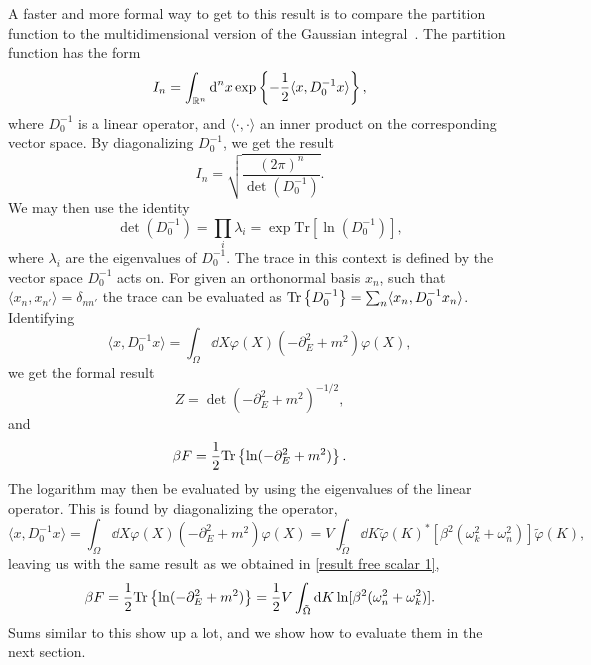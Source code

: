 A faster and more formal way to get to this result is to compare the partition function to the multidimensional version of the Gaussian integral~\autocite{kapustaFiniteTemperatureFieldTheory2006,peskinIntroductionQuantumField1995}.
The partition function has the form 
\begin{equation}
    I_n = \int_{\mathbb{R}^n} \text{d}^n x\, \text{exp} \left\{ - \frac{1}{2} \langle x, D_0^{-1} x\rangle  \right\},
\end{equation}
where $D_0^{-1}$ is a linear operator, and $\langle \cdot , \cdot \rangle$ an inner product on the corresponding vector space.
By diagonalizing $D_0^{-1}$, we get the result
\begin{equation}
    I_n = \sqrt{\frac{(2 \pi)^n}{\det(D_0^{-1})}}.
\end{equation}
We may then use the identity
%
\begin{equation}
    \label{lndettrln}
    \det(D_0^{-1}) = \prod_i \lambda_i = \exp{\text{Tr}[\ln(D_0^{-1})]},
\end{equation}
%
where $\lambda_i$ are the eigenvalues of $D_0^{-1}$.
The trace in this context is defined by the vector space $D_0^{-1}$ acts on.
For given an orthonormal basis $x_n$, such that $\langle x_n, x_{n'}\rangle = \delta_{nn'}$ the trace can be evaluated as $\text{Tr} \left\{ D_0^{-1} \right\} = \sum_n \langle x_n, D_0^{-1} x_n \rangle$.
Identifying 
\begin{equation}
    \langle x, D_0^{-1} x\rangle = \int_\Omega \dd X \varphi(X)\left(-\partial_E^2+m^2\right)\varphi(X),
\end{equation}
we get the formal result
\begin{equation}
    Z = \det(-\partial_E^2 + m^2)^{-1/2},
\end{equation}
and 
\begin{equation}
    \beta F = \frac{1}{2}\text{Tr} \left\{ \ln(-\partial_E^2 + m^2) \right\}.
\end{equation}
The logarithm may then be evaluated by using the eigenvalues of the linear operator.
This is found by diagonalizing the operator,
\begin{equation}
    \langle x, D_0^{-1} x \rangle 
    = \int_\Omega \dd X \varphi(X)\left(-\partial_E^2+m^2\right)\varphi(X)
    = V  \int_{\tilde \Omega} \dd K 
    \tilde \varphi(K)^* [\beta^2(\omega_k^2 +\omega_n^2)] \tilde \varphi(K),
\end{equation}
leaving us with the same result as we obtained in 
\autoref{result free scalar 1},
\begin{equation}
    \beta F 
    = \frac{1}{2} \text{Tr} \left\{ \ln(-\partial_E^2 + m^2) \right\} 
    = \frac{1}{2} V \int_{\tilde \Omega} \text{d} K \ln[\beta^2(\omega_n^2 + \omega_k^2)].
\end{equation}
Sums similar to this show up a lot, and we show how to evaluate them in the next section.
